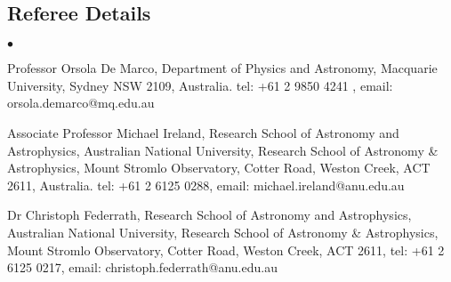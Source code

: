 \documentclass[margin,line]{res}
\newenvironment{list2}{
	\begin{list}{$\bullet$}{%
			\setlength{\itemsep}{0in}
			\setlength{\parsep}{0in} \setlength{\parskip}{0in}
			\setlength{\topsep}{0in} \setlength{\partopsep}{0in} 
			\setlength{\leftmargin}{0.2in}}}{\end{list}}
\begin{document}
\begin{resume}
		\section{\sc Referee Details}
		\begin{list2}
			\item Professor Orsola De Marco, Department of Physics and Astronomy, Macquarie University, Sydney NSW 2109, Australia. tel: +61 2 9850 4241 , email: orsola.demarco@mq.edu.au
			\item Associate Professor Michael Ireland, Research School of Astronomy and Astrophysics, Australian National University, Research School of Astronomy \& Astrophysics, Mount Stromlo Observatory, Cotter Road, Weston Creek, ACT 2611, Australia. tel: +61 2 6125 0288, email: michael.ireland@anu.edu.au 
			\item Dr Christoph Federrath, Research School of Astronomy and Astrophysics, Australian National University, Research School of Astronomy \& Astrophysics, Mount Stromlo Observatory, Cotter Road, Weston Creek, ACT 2611, tel: +61 2 6125 0217, email: christoph.federrath@anu.edu.au
		\end{list2}
	
		\newpage

\end{resume}
\end{document}
